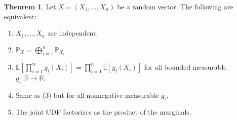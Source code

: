 \documentclass[11pt,a4paper]{article}
\theoremstyle{definition}
\newtheorem{theorem}{Theorem}[section]
\begin{document}
\begin{theorem}
Let $X=(X_1,\dots,X_n)$ be a random vector. The following are equivalent:
\begin{enumerate}
    \item $X_1, \dots, X_n$ are independent.
    \item $\mathbb{P}_X = \bigoplus_{i=1}^n \mathbb{P}_{X_i}$.
    \item $\mathbb{E}\!\left[\prod\limits _{i=1}^n g_i(X_i)\right] = \prod\limits _{i=1}^n \mathbb{E}[g_i(X_i)]$ for all bounded measurable $g_i:\mathbb{R} \to \mathbb{R}$.
    \item Same as (3) but for all nonnegative measurable $g_i$.
    \item The joint CDF factorizes as the product of the marginals.
\end{enumerate}
\end{theorem}
\end{document}
